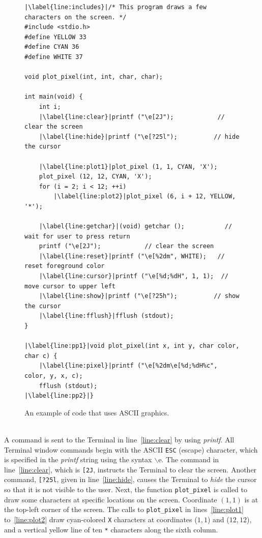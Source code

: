 \documentclass[epsfig,10pt,fullpage]{article}
\begin{document}
\lstset{language=C,numbers=left,escapechar=|}
\begin{figure}[h]
\begin{center}
\begin{minipage}[t]{12.5 cm}
\begin{lstlisting}[name=dots]
|\label{line:includes}|/* This program draws a few characters on the screen. */
#include <stdio.h>
#define YELLOW 33
#define CYAN 36
#define WHITE 37

void plot_pixel(int, int, char, char);

int main(void) {
    int i;
    |\label{line:clear}|printf ("\e[2J");            // clear the screen
    |\label{line:hide}|printf ("\e[?25l");          // hide the cursor

    |\label{line:plot1}|plot_pixel (1, 1, CYAN, 'X');
    plot_pixel (12, 12, CYAN, 'X');
    for (i = 2; i < 12; ++i)
        |\label{line:plot2}|plot_pixel (6, i + 12, YELLOW, '*');

    |\label{line:getchar}|(void) getchar ();           // wait for user to press return
    printf ("\e[2J");            // clear the screen
    |\label{line:reset}|printf ("\e[%2dm", WHITE);   // reset foreground color
    |\label{line:cursor}|printf ("\e[%d;%dH", 1, 1);  // move cursor to upper left
    |\label{line:show}|printf ("\e[?25h");          // show the cursor
    |\label{line:fflush}|fflush (stdout);
}

|\label{line:pp1}|void plot_pixel(int x, int y, char color, char c) {
    |\label{line:pixel}|printf ("\e[%2dm\e[%d;%dH%c", color, y, x, c);
    fflush (stdout);
|\label{line:pp2}|}
\end{lstlisting}
\end{minipage}
\caption{An example of code that uses ASCII graphics.}
\label{fig:dots}
\end{center}
\end{figure}

~\\
\noindent
A command is sent to the Terminal in line~\ref{line:clear} by using {\it printf}. All Terminal 
window commands begin with the ASCII \texttt{ESC} (escape) character, which is specified 
in the {\it printf} string using the syntax $\backslash$e. The command in line~\ref{line:clear},
which is \texttt{[2J}, instructs the Terminal to clear the screen. Another command, 
\texttt{[?25l}, given in line~\ref{line:hide}, causes the Terminal to {\it hide} the cursor 
so that it is not visible to the user. Next, the function \texttt{plot\_pixel} is called to draw
some characters at specific locations on the screen.  Coordinate $(1, 1)$ is at the top-left corner 
of the screen. The calls to \texttt{plot\_pixel} in
lines~\ref{line:plot1} to~\ref{line:plot2} draw cyan-colored \texttt{X} characters at
coordinates ($1, 1$) and ($12, 12$), and a vertical yellow line of ten \texttt{*} characters
along the sixth column.
\end{document}
